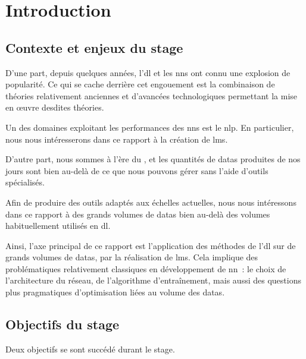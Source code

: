 \chapter{Introduction}

\section[Contexte \& Enjeux]{Contexte et enjeux du stage}

D'une part, depuis quelques années, l'\gls{dl} et les \glspl{nn} ont connu une explosion de popularité.
Ce qui se cache derrière cet engouement est la combinaison de théories relativement anciennes et d'avancées technologiques permettant la mise en œuvre desdites théories.

Un des domaines exploitant les performances des \glspl{nn} est le \gls{nlp}.
En particulier, nous nous intéresserons dans ce rapport à la création de \glspl{lm}.

D'autre part, nous sommes à l'ère du , et les quantités de \glspl{data} produites de nos jours sont bien au-delà de ce que nous pouvons gérer sans l'aide d'outils spécialisés.

Afin de produire des outils adaptés aux échelles actuelles, nous nous intéressons dans ce rapport à des grands volumes de \glspl{data} bien au-delà des volumes habituellement utilisés en \gls{dl}.

Ainsi, l'axe principal de ce rapport est l'application des méthodes de l'\gls{dl} sur de grands volumes de \glspl{data}, par la réalisation de \glspl{lm}.
Cela implique des problématiques relativement classiques en développement de \gls{nn}~: le choix de l'architecture du réseau, de l'algorithme d'entraînement, mais aussi des questions plus pragmatiques d'optimisation liées au volume des \glspl{data}.

\newpage
\section[Objectifs]{Objectifs du stage}
Deux objectifs se sont succédé durant le stage.

